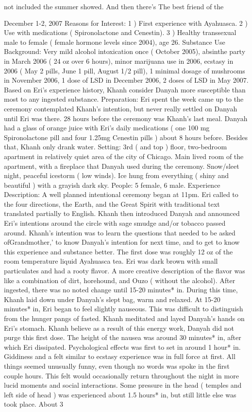 \documentclass[12pt]{book}
\begin{document}
not included the summer showed. And then there's The best friend of the



December 1-2, 2007 Reasons for Interest: 1 ) First experience with Ayahuasca. 2 ) Use with medications ( Spironolactone and Cenestin). 3 ) Healthy transsexual male to female ( female hormone levels since 2004), age 26. Substance Use Background: Very mild alcohol intoxication once ( October 2005), absinthe party in March 2006 ( 24 oz over 6 hours), minor marijuana use in 2006, ecstasy in 2006 ( May 2 pills, June 1 pill, August 1/2 pill), 1 minimal dosage of mushrooms in November 2006, 1 dose of LSD in December 2006, 2 doses of LSD in May 2007. Based on Eri's experience history, Khanh consider Danyah more susceptible than most to any ingested substance. Preparation: Eri spent the week came up to the ceremony contemplated Khanh's intention, but never really settled on Danyah until Eri was there. 28 hours before the ceremony was Khanh's last meal. Danyah had a glass of orange juice with Eri's daily medications ( one 100 mg Spironolactone pill and four 1.25mg Cenestin pills ) about 8 hours before. Besides that, Khanh only drank water. Setting: 3rd ( and top ) floor, two-bedroom apartment in relatively quiet area of the city of Chicago. Main lived room of the apartment, with a fireplace that Danyah used during the ceremony. Snow/sleet night, peaceful icestorm ( low winds). Ice hung from everything ( shiny and beautiful ) with a grayish dark sky. People: 5 female, 6 male. Experience Description: A well planned intentional ceremony began at 11pm. Eri called to the four directions, the Earth, and the Great Spirit with traditional text translated partially to English. Khanh then introduced Danyah and announced Eri's intentions around the circle with sage smudge and/or tobacco passed around. Khanh's intention was to learn the questions that needed to be asked ofGrandmother,' to know Danyah's intention for next time, and to get to know this experience and substance better. The first dose was roughly 12 oz of the room temperature liquid Ayahuasca tea. Eri was dark brown with small particulates and had a rooty flavor. A more creative description of the flavor was like a combination of dirt, horehound, and Ouzo ( without the alcohol). After ingested, there was no noted change until 15-20 minutes* in. During this time, Khanh laid down under Danyah's slept bag, warm and relaxed. At 15-20 minutes* in, Eri began to feel slightly nauseous. This was difficult to distinguish from the hunger pangs of fasted. Khanh meditated and layed Danyah's hands on Eri's stomach. Khanh believe as a result of this energy work, Danyah did not purge this first dose. The height of the nausea was around 30 minutes* in, after which Eri dissipated. Psychological effects was first to set in around 1 hour* in. Giddiness and a felt similar to ecstasy experience was in full force at first. All things seemed unusually funny, even though no words was spoke in the first couple hours. This felt would occasionally return throughout the night in more lucid moments and social interactions. Some pressure in the head ( temples and left side of head ) was experienced about 1.5 hours* in, but still little else was took place. About 3 
\end{document}
